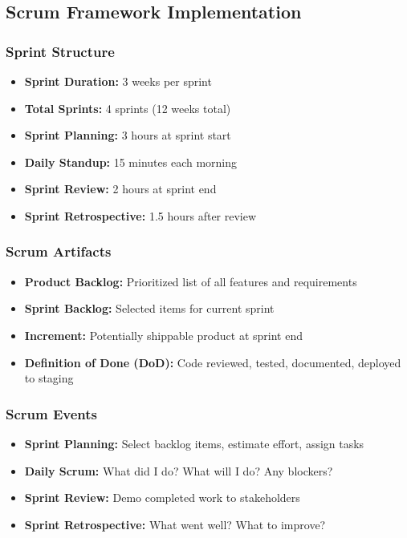 \documentclass[12pt,a4paper]{article}
\begin{document}
\subsection{Scrum Framework Implementation}

\subsubsection{Sprint Structure}
\begin{itemize}[noitemsep]
    \item \textbf{Sprint Duration:} 3 weeks per sprint
    \item \textbf{Total Sprints:} 4 sprints (12 weeks total)
    \item \textbf{Sprint Planning:} 3 hours at sprint start
    \item \textbf{Daily Standup:} 15 minutes each morning
    \item \textbf{Sprint Review:} 2 hours at sprint end
    \item \textbf{Sprint Retrospective:} 1.5 hours after review
\end{itemize}

\subsubsection{Scrum Artifacts}
\begin{itemize}[noitemsep]
    \item \textbf{Product Backlog:} Prioritized list of all features and requirements
    \item \textbf{Sprint Backlog:} Selected items for current sprint
    \item \textbf{Increment:} Potentially shippable product at sprint end
    \item \textbf{Definition of Done (DoD):} Code reviewed, tested, documented, deployed to staging
\end{itemize}

\subsubsection{Scrum Events}
\begin{itemize}[noitemsep]
    \item \textbf{Sprint Planning:} Select backlog items, estimate effort, assign tasks
    \item \textbf{Daily Scrum:} What did I do? What will I do? Any blockers?
    \item \textbf{Sprint Review:} Demo completed work to stakeholders
    \item \textbf{Sprint Retrospective:} What went well? What to improve?
\end{itemize}
\end{document}
